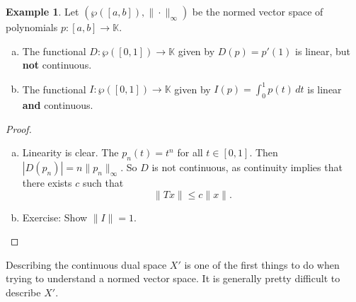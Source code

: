 \documentclass[10pt, reqno, oneside]{amsart}
\theoremstyle{plain}%
\theoremstyle{definition}
\newtheorem{exmp}[thm]{Example}
\theoremstyle{remark}
\newcommand{\K}{\mathbb{K}}
\begin{document}
\begin{exmp}
	Let $(\wp([a,b]), \| \cdot \|_\infty)$ be the normed vector space of polynomials $p: [a,b] \rightarrow \K$. 				
	\begin{enumerate}[(a)]
		\item The functional $D : \wp([0,1]) \rightarrow \K$ given by $D(p) = p'(1)$ is linear, but \textbf{not} continuous.
		\item The functional $I: \wp([0,1]) \rightarrow \K$ given by $I(p) = \int_0^1 p(t) \, dt$ is linear \textbf{and} continuous.
	\end{enumerate}
\end{exmp}

\begin{proof}
\begin{enumerate}[(a)]
		\item Linearity is clear.  The $p_n(t) = t^n$ for all $t \in [0,1]$.  Then $|D(p_n)| =   n \| p_n \|_\infty$.  So $D$ is not continuous, as continuity implies that there exists $c$ such that \[
			\| Tx \| \leq c \| x \|.
		\]
		\item Exercise: Show $\| I \| = 1$.
\end{enumerate}
\end{proof}

Describing the continuous dual space $X'$ is one of the first things to do when trying to understand a normed vector space.  It is generally pretty difficult to describe $X'$.
\end{document}
